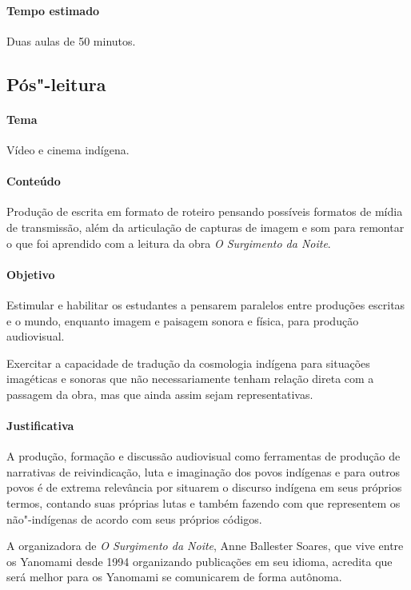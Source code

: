 \documentclass[12pt]{extarticle}
\begin{document}
{


\paragraph{Tempo estimado} Duas aulas de 50 minutos.


\subsection{Pós"-leitura}

\paragraph{Tema} Vídeo e cinema indígena.

\paragraph{Conteúdo} Produção de escrita em formato de roteiro pensando possíveis
formatos de mídia de transmissão, além da articulação de capturas de imagem e som 
para remontar o que foi aprendido com a leitura da obra \textit{O Surgimento da Noite}.

\paragraph{Objetivo} Estimular e habilitar os estudantes a pensarem paralelos 
entre produções escritas e o mundo, enquanto imagem e paisagem sonora e física,
para produção audiovisual. 

Exercitar a capacidade de tradução da cosmologia indígena para situações imagéticas
e sonoras que não necessariamente tenham relação direta com a passagem da obra, mas 
que ainda assim sejam representativas.

\paragraph{Justificativa} A produção, formação e discussão audiovisual como ferramentas 
de produção de narrativas de reivindicação, luta e imaginação dos povos indígenas e para 
outros povos é de extrema relevância por situarem o discurso indígena em seus próprios 
termos, contando suas próprias lutas e também fazendo com que representem os não"-indígenas 
de acordo com seus próprios códigos.

A organizadora de \textit{O Surgimento da Noite}, Anne Ballester Soares, que vive entre os Yanomami 
desde 1994 organizando publicações em seu idioma, acredita que será melhor para os Yanomami 
se comunicarem de forma autônoma.

}
\end{document}
